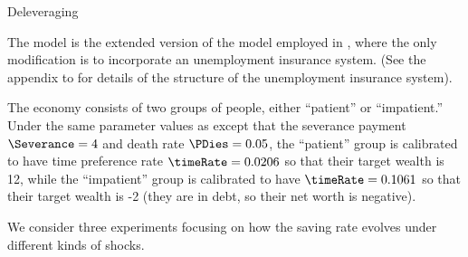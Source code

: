 \documentclass[titlepage,abstract,letterpaper]{econtex}
\begin{document}
\begin{center}
\Large Deleveraging 
\end{center}

The model is the extended version of the \cite{ctDiscrete} model employed in \cite{cssUSSaving}, where the only modification is to incorporate an unemployment insurance system.  (See the appendix to \cite{cssUSSaving} for details of the structure of the unemployment insurance system).

The economy consists of two groups of people, either ``patient'' or ``impatient.'' Under the same parameter values as \cite{ctDiscrete} except that the severance payment $\Severance=4$ and death rate $\PDies=0.05$, the ``patient'' group is calibrated to have time preference rate $\timeRate=0.0206$ so that their target wealth is 12, while the ``impatient'' group is calibrated to have $\timeRate=0.1061$ so that their target wealth is -2 (they are in debt, so their net worth is negative).

We consider three experiments focusing on how the saving rate evolves under different kinds of shocks.
\end{document}

